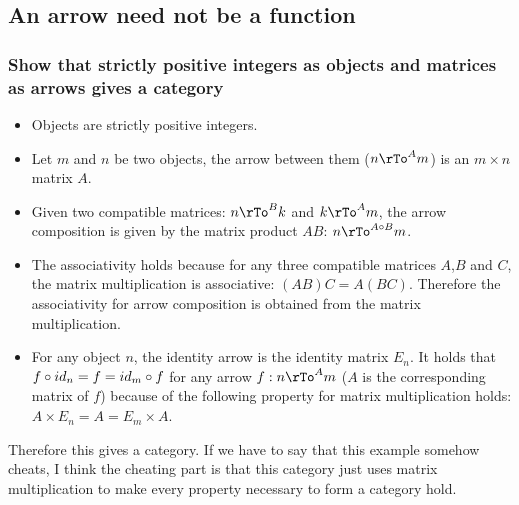 \documentclass[11pt]{article}
\begin{document}
\subsection{An arrow need not be a function}

\subsubsection{Show that strictly positive integers as objects and matrices as arrows
gives a category}

\begin{itemize}
  \item Objects are strictly positive integers.
  \item Let $m$ and $n$ be two objects, the arrow between them
    ($n \rTo^A m$)
    is an $m \times n$ matrix $A$.
  \item Given two compatible matrices:
    $n \rTo^B k$ and $k \rTo^A m$,
    the arrow composition is given by the matrix product $AB$:
    $n \rTo^{A \fcomp B} m$.
  \item The associativity holds because for any three compatible matrices $A$,$B$ and $C$,
    the matrix multiplication is associative: $(AB)C = A(BC)$.
    Therefore the associativity for arrow composition is obtained from the matrix
    multiplication.
  \item For any object $n$, the identity arrow is the identity matrix $E_n$.
    It holds that $f \circ id_n = f = id_m \circ f$ for any arrow $f : n \rTo^A m$
    ($A$ is the corresponding matrix of $f$) because of the following property for
    matrix multiplication holds: $ A \times E_n = A = E_m \times A$.
\end{itemize}

Therefore this gives a category. If we have to say that this example somehow cheats,
I think the cheating part is that this category just uses matrix multiplication
to make every property necessary to form a category hold.
\end{document}
